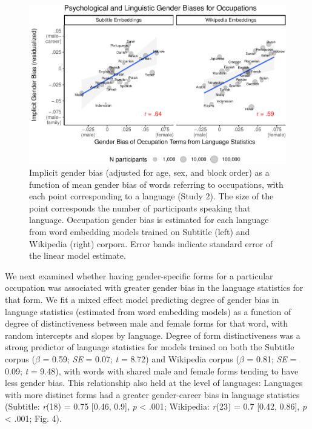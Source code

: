 \documentclass[man,floatsintext]{apa6}
\begin{document}
\begin{figure}
\centering
\includegraphics{iat_lang_files/figure-latex/unnamed-chunk-15-1.pdf}
\caption{\label{fig:unnamed-chunk-15}Implicit gender bias (adjusted for age, sex, and block order) as a function of mean gender bias of words referring to occupations, with each point corresponding to a language (Study 2). The size of the point corresponds the number of participants speaking that language. Occupation gender bias is estimated for each language from word embedding models trained on Subtitle (left) and Wikipedia (right) corpora. Error bands indicate standard error of the linear model estimate.}
\end{figure}

We next examined whether having gender-specific forms for a particular occupation was associated with greater gender bias in the language statistics for that form. We fit a mixed effect model predicting degree of gender bias in language statistics (estimated from word embedding models) as a function of degree of distinctiveness between male and female forms for that word, with random intercepts and slopes by language. Degree of form distinctiveness was a strong predictor of language statistics for models trained on both the Subtitle corpus (\(\beta\) = 0.59; \emph{SE} = 0.07; \emph{t} = 8.72) and Wikipedia corpus (\(\beta\) = 0.81; \emph{SE} = 0.09; \emph{t} = 9.48), with words with shared male and female forms tending to have less gender bias. This relationship also held at the level of languages: Languages with more distinct forms had a greater gender-career bias in language statistics (Subtitle: \emph{r}(18) = 0.75 {[}0.46, 0.9{]}, \emph{p} \textless{} .001; Wikipedia: \emph{r}(23) = 0.7 {[}0.42, 0.86{]}, \emph{p} \textless{} .001; Fig. 4).
\end{document}
